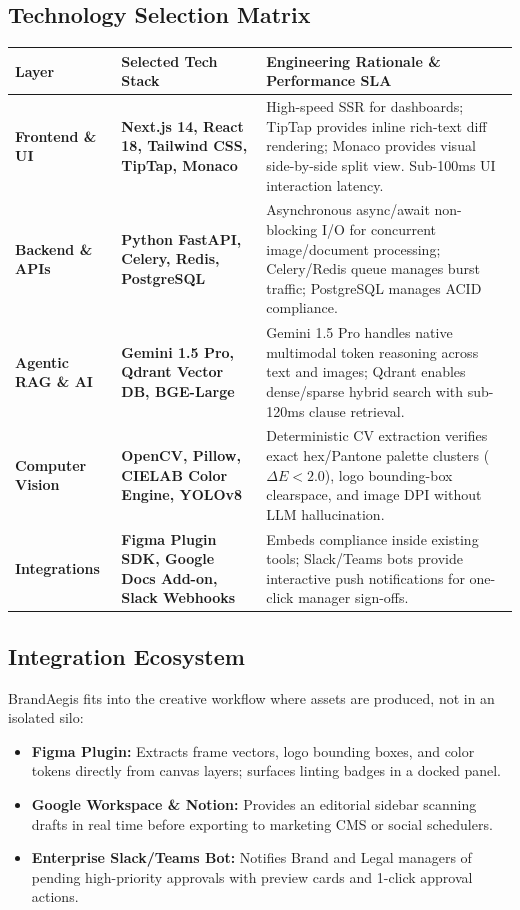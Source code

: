 \documentclass[10pt,a4paper]{article}
\begin{document}
\subsection{Technology Selection Matrix}
\begin{table}[h!]
\centering
\small
\renewcommand{\arraystretch}{1.18}
\begin{tabularx}{\textwidth}{p{2.6cm} p{3.8cm} X}
\toprule
\textbf{Layer} & \textbf{Selected Tech Stack} & \textbf{Engineering Rationale \& Performance SLA} \\
\midrule
\textbf{Frontend \& UI} & 
\textbf{Next.js 14, React 18, Tailwind CSS, TipTap, Monaco} & 
High-speed SSR for dashboards; TipTap provides inline rich-text diff rendering; Monaco provides visual side-by-side split view. Sub-100ms UI interaction latency. \\
\midrule
\textbf{Backend \& APIs} & 
\textbf{Python FastAPI, Celery, Redis, PostgreSQL} & 
Asynchronous async/await non-blocking I/O for concurrent image/document processing; Celery/Redis queue manages burst traffic; PostgreSQL manages ACID compliance. \\
\midrule
\textbf{Agentic RAG \& AI} & 
\textbf{Gemini 1.5 Pro, Qdrant Vector DB, BGE-Large} & 
Gemini 1.5 Pro handles native multimodal token reasoning across text and images; Qdrant enables dense/sparse hybrid search with sub-120ms clause retrieval. \\
\midrule
\textbf{Computer Vision} & 
\textbf{OpenCV, Pillow, CIELAB Color Engine, YOLOv8} & 
Deterministic CV extraction verifies exact hex/Pantone palette clusters ($\Delta E < 2.0$), logo bounding-box clearspace, and image DPI without LLM hallucination. \\
\midrule
\textbf{Integrations} & 
\textbf{Figma Plugin SDK, Google Docs Add-on, Slack Webhooks} & 
Embeds compliance inside existing tools; Slack/Teams bots provide interactive push notifications for one-click manager sign-offs. \\
\bottomrule
\end{tabularx}
\end{table}

\vspace{0.1cm}

\subsection{Integration Ecosystem}
\small BrandAegis fits into the creative workflow where assets are produced, not in an isolated silo:
\begin{itemize}[leftmargin=*,itemsep=1.5pt]
  \item \textbf{Figma Plugin:} Extracts frame vectors, logo bounding boxes, and color tokens directly from canvas layers; surfaces linting badges in a docked panel.
  \item \textbf{Google Workspace \& Notion:} Provides an editorial sidebar scanning drafts in real time before exporting to marketing CMS or social schedulers.
  \item \textbf{Enterprise Slack/Teams Bot:} Notifies Brand and Legal managers of pending high-priority approvals with preview cards and 1-click approval actions.
\end{itemize}
\end{document}

